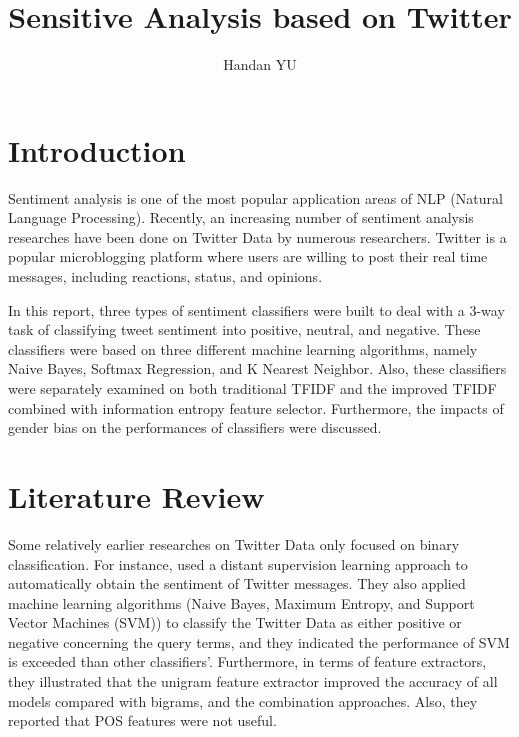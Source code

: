 \documentclass[11pt]{article}
\title{Sensitive Analysis based on Twitter}
\author
{Handan YU}
\begin{document}
\maketitle


\section{Introduction}
Sentiment analysis is one of the most popular application areas of NLP (Natural Language Processing). Recently, an increasing number of sentiment analysis researches have been done on Twitter Data by numerous researchers. Twitter is a popular microblogging platform where users are willing to post their real time messages, including reactions, status, and opinions. 

In this report, three types of sentiment classifiers were built to deal with a 3-way task of classifying tweet sentiment into positive, neutral, and negative. These classifiers were based on three different machine learning algorithms, namely Naive Bayes, Softmax Regression, and K Nearest Neighbor. Also, these classifiers were separately examined on both traditional TFIDF and the improved TFIDF combined with information entropy feature selector. Furthermore, the impacts of gender bias on the performances of classifiers were discussed. 
\section{Literature Review}

Some relatively earlier researches on Twitter Data only focused on binary classification.  For instance, \cite{Go_Bhayani_Huang_2009} used a distant supervision learning approach to automatically obtain the sentiment of Twitter messages. They also applied machine learning algorithms (Naive Bayes, Maximum Entropy, and Support Vector Machines (SVM)) to classify the Twitter Data as either positive or negative concerning the query terms, and they indicated the performance of SVM is exceeded than other classifiers'. Furthermore, in terms of feature extractors, they illustrated that the unigram feature extractor improved the accuracy of all models compared with bigrams, and the combination approaches. Also, they reported that POS features were not useful. 
\end{document}
